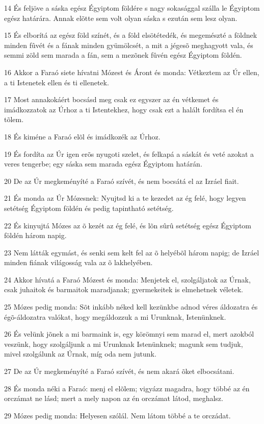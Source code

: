 \par 14 És feljöve a sáska egész Égyiptom földére s nagy sokasággal szálla le Égyiptom egész határára. Annak elõtte sem volt olyan sáska s ezután sem lesz olyan.
\par 15 És elborítá az egész föld színét, és a föld elsötétedék, és megemészté a földnek minden fûvét és a fának minden gyümölcsét, a mit a jégesõ meghagyott vala, és semmi zöld sem marada a fán, sem a mezõnek fûvén egész Égyiptom földén.
\par 16 Akkor a Faraó siete hívatni Mózest és Áront és monda: Vétkeztem az Úr ellen, a ti Istenetek ellen és ti ellenetek.
\par 17 Most annakokáért bocsásd meg csak ez egyszer az én vétkemet és imádkozzatok az Úrhoz a ti Istentekhez, hogy csak ezt a halált fordítsa el én tõlem.
\par 18 És kiméne a Faraó elõl és imádkozék az Úrhoz.
\par 19 És fordíta az Úr igen erõs nyugoti szelet, és felkapá a sáskát és veté azokat a veres tengerbe; egy sáska sem marada egész Égyiptom határán.
\par 20 De az Úr megkeményíté a Faraó szívét, és nem bocsátá el az Izráel fiait.
\par 21 És monda az Úr Mózesnek: Nyujtsd ki a te kezedet az ég felé, hogy legyen setétség Égyiptom földén és pedig tapintható setétség.
\par 22 És kinyujtá Mózes az õ kezét az ég felé, és lõn sûrû setétség egész Égyiptom földén három napig.
\par 23 Nem látták egymást, és senki sem kelt fel az õ helyébõl három napig; de Izráel minden fiának világosság vala az õ lakhelyében.
\par 24 Akkor hívatá a Faraó Mózest és monda: Menjetek el, szolgáljatok az Úrnak, csak juhaitok és barmaitok maradjanak; gyermekeitek is elmehetnek véletek.
\par 25 Mózes pedig monda: Sõt inkább néked kell kezünkbe adnod véres áldozatra és égõ-áldozatra valókat, hogy megáldozzuk a mi Urunknak, Istenünknek.
\par 26 És velünk jõnek a mi barmaink is, egy körömnyi sem marad el, mert azokból veszünk, hogy szolgáljunk a mi Urunknak Istenünknek; magunk sem tudjuk, mivel szolgálunk az Úrnak, míg oda nem jutunk.
\par 27 De az Úr megkeményíté a Faraó szívét, és nem akará õket elbocsátani.
\par 28 És monda néki a Faraó: menj el elõlem; vigyázz magadra, hogy többé az én orczámat ne lásd; mert a mely napon az én orczámat látod, meghalsz.
\par 29 Mózes pedig monda: Helyesen szólál. Nem látom többé a te orczádat.


